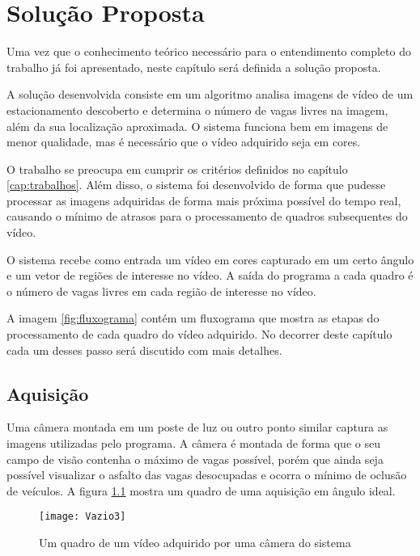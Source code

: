 \chapter{Solução Proposta}\label{cap:solucao}

Uma vez que o conhecimento teórico necessário para o entendimento completo do trabalho já foi apresentado, neste capítulo será definida a solução proposta.

A solução desenvolvida consiste em um algoritmo analisa imagens de vídeo de um estacionamento descoberto e determina o número de vagas livres na imagem, além da sua localização aproximada. O sistema funciona bem em imagens de menor qualidade, mas é necessário que o vídeo adquirido seja em cores.

O trabalho se preocupa em cumprir os critérios definidos no capítulo \ref{cap:trabalhos}. Além disso, o sistema foi desenvolvido de forma que pudesse processar as imagens adquiridas de forma mais próxima possível do tempo real, causando o mínimo de atrasos para o processamento de quadros subsequentes do vídeo.

O sistema recebe como entrada um vídeo em cores capturado em um certo ângulo e um vetor de regiões de interesse no vídeo. A saída do programa a cada quadro é o número de vagas livres em cada região de interesse no vídeo.

A imagem \ref{fig:fluxograma} contém um fluxograma que mostra as etapas do processamento de cada quadro do vídeo adquirido. No decorrer deste capítulo cada um desses passo será discutido com mais detalhes.




\section{Aquisição}\label{sec:aquisicao}

Uma câmera montada em um poste de luz ou outro ponto similar captura as imagens utilizadas pelo programa. A câmera é montada de forma que o seu campo de visão contenha o máximo de vagas possível, porém que ainda seja possível visualizar o asfalto das vagas desocupadas e ocorra o mínimo de oclusão de veículos. A figura \ref{fig:aquisicao} mostra um quadro de uma aquisição em ângulo ideal.

\begin{figure}[!ht]
	\centering
	\texttt{[image: Vazio3]}
	\label{fig:aquisicao}
	\caption{Um quadro de um vídeo adquirido por uma câmera do sistema}
	\centering
\end{figure}

